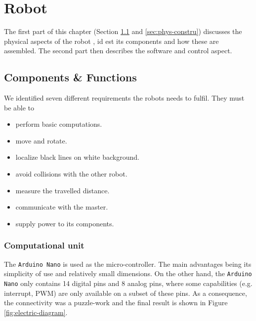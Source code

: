 \documentclass[12pt]{report}
\begin{document}


\chapter{Robot}\label{chapter-construction}
The first part of this chapter (Section \ref{sec:components} and \ref{sec:phys-constru}) discusses the physical aspects of the robot , id est its components and how these are assembled. The second part then describes the software and control aspect.

\section{Components \& Functions}\label{sec:components}
We identified seven different requirements the robots needs to fulfil. They must be able to 
\begin{itemize}
\item perform basic computations.
\item move and rotate.
\item localize black lines on white background.
\item avoid collisions with the other robot.
\item measure the travelled distance.
\item communicate with the master.
\item supply power to its components.
\end{itemize}

\subsection*{Computational unit}
The \texttt{Arduino Nano} is used as the micro-controller. The main advantages being its simplicity of use and relatively small dimensions. On the other hand, the \texttt{Arduino Nano} only contains 14 digital pins and 8 analog pins, where some capabilities (e.g. interrupt, PWM) are only available on a subset of these pins. As a consequence, the connectivity was a puzzle-work and the final result is shown in Figure \ref{fig:electric-diagram}.
\end{document}
